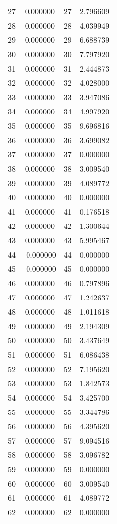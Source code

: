 \documentclass[12pt]{article}
\begin{document}
\begin{longtable}{@{}cccc@{}}
27 & 0.000000 & 27 & 2.796609 \\
28 & 0.000000 & 28 & 4.039949 \\
29 & 0.000000 & 29 & 6.688739 \\
30 & 0.000000 & 30 & 7.797920 \\
31 & 0.000000 & 31 & 2.444873 \\
32 & 0.000000 & 32 & 4.028000 \\
33 & 0.000000 & 33 & 3.947086 \\
34 & 0.000000 & 34 & 4.997920 \\
35 & 0.000000 & 35 & 9.696816 \\
36 & 0.000000 & 36 & 3.699082 \\
37 & 0.000000 & 37 & 0.000000 \\
38 & 0.000000 & 38 & 3.009540 \\
39 & 0.000000 & 39 & 4.089772 \\
40 & 0.000000 & 40 & 0.000000 \\
41 & 0.000000 & 41 & 0.176518 \\
42 & 0.000000 & 42 & 1.300644 \\
43 & 0.000000 & 43 & 5.995467 \\
44 & -0.000000 & 44 & 0.000000 \\
45 & -0.000000 & 45 & 0.000000 \\
46 & 0.000000 & 46 & 0.797896 \\
47 & 0.000000 & 47 & 1.242637 \\
48 & 0.000000 & 48 & 1.011618 \\
49 & 0.000000 & 49 & 2.194309 \\
50 & 0.000000 & 50 & 3.437649 \\
51 & 0.000000 & 51 & 6.086438 \\
52 & 0.000000 & 52 & 7.195620 \\
53 & 0.000000 & 53 & 1.842573 \\
54 & 0.000000 & 54 & 3.425700 \\
55 & 0.000000 & 55 & 3.344786 \\
56 & 0.000000 & 56 & 4.395620 \\
57 & 0.000000 & 57 & 9.094516 \\
58 & 0.000000 & 58 & 3.096782 \\
59 & 0.000000 & 59 & 0.000000 \\
60 & 0.000000 & 60 & 3.009540 \\
61 & 0.000000 & 61 & 4.089772 \\
62 & 0.000000 & 62 & 0.000000 \\

\end{longtable}
\end{document}
